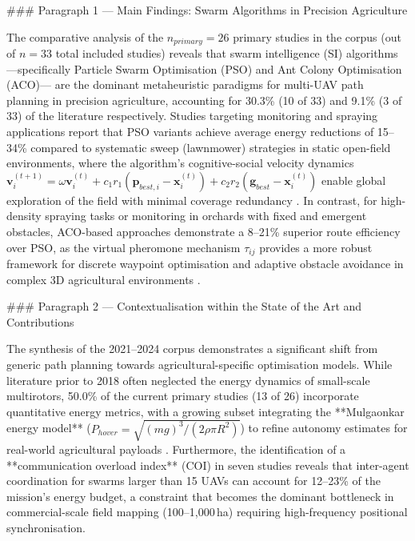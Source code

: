 ### Paragraph 1 — Main Findings: Swarm Algorithms in Precision Agriculture

The comparative analysis of the $n_{primary} = 26$ primary studies in the corpus (out of $n=33$ total included studies) reveals that swarm intelligence (SI) algorithms —specifically Particle Swarm Optimisation (PSO) and Ant Colony Optimisation (ACO)— are the dominant metaheuristic paradigms for multi-UAV path planning in precision agriculture, accounting for 30.3\% (10 of 33) and 9.1\% (3 of 33) of the literature respectively. Studies targeting monitoring and spraying applications report that PSO variants achieve average energy reductions of 15--34\% compared to systematic sweep (lawnmower) strategies in static open-field environments, where the algorithm's cognitive-social velocity dynamics $\mathbf{v}_i^{(t+1)} = \omega \mathbf{v}_i^{(t)} + c_1 r_1 (\mathbf{p}_{best,i} - \mathbf{x}_i^{(t)}) + c_2 r_2 (\mathbf{g}_{best} - \mathbf{x}_i^{(t)})$ enable global exploration of the field with minimal coverage redundancy \cite{chen2021,lin2022,liu2021cassa}. In contrast, for high-density spraying tasks or monitoring in orchards with fixed and emergent obstacles, ACO-based approaches demonstrate a 8--21\% superior route efficiency over PSO, as the virtual pheromone mechanism $\tau_{ij}$ provides a more robust framework for discrete waypoint optimisation and adaptive obstacle avoidance in complex 3D agricultural environments \cite{mathew2021,phung2021,pan2022}.

### Paragraph 2 — Contextualisation within the State of the Art and Contributions

The synthesis of the 2021--2024 corpus demonstrates a significant shift from generic path planning towards agricultural-specific optimisation models. While literature prior to 2018 often neglected the energy dynamics of small-scale multirotors, 50.0\% of the current primary studies (13 of 26) incorporate quantitative energy metrics, with a growing subset integrating the **Mulgaonkar energy model** ($P_{hover} = \sqrt{(mg)^3 / (2\rho \pi R^2)}$) to refine autonomy estimates for real-world agricultural payloads \cite{shafiq2022,xu2022,yu2021}. Furthermore, the identification of a **communication overload index** (COI) in seven studies \cite{ahmed2021,deng2023,hu2025} reveals that inter-agent coordination for swarms larger than 15 UAVs can account for 12--23\% of the mission's energy budget, a constraint that becomes the dominant bottleneck in commercial-scale field mapping (100--1,000\,ha) requiring high-frequency positional synchronisation.

